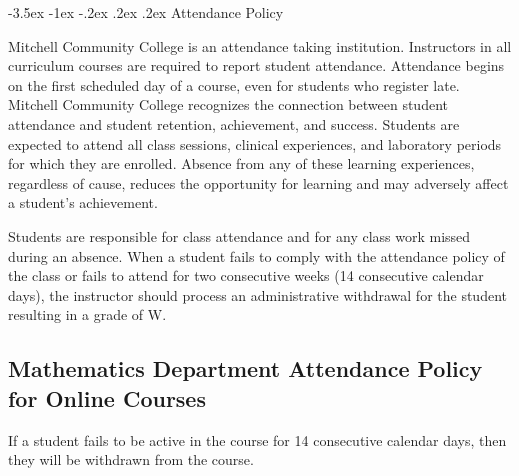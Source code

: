 \documentclass[11pt]{article}
\makeatletter
\renewcommand\section{\@startsection{section}{1}{0pt}%
  {-3.5ex \@plus -1ex \@minus -.2ex}%
  {.2ex \@plus.2ex}%
  {\normalfont\Large\bfseries}} %
\makeatother
\begin{document}
\section{Attendance Policy}

Mitchell Community College is an attendance taking institution. Instructors in all curriculum courses are required to report student attendance. Attendance begins on the first scheduled day of a course, even for students who register late. Mitchell Community College recognizes the connection between student attendance and student retention, achievement, and success. Students are expected to attend all class sessions, clinical experiences, and laboratory periods for which they are enrolled. Absence from any of these learning experiences, regardless of cause, reduces the opportunity for learning and may adversely affect a student's achievement.

Students are responsible for class attendance and for any class work missed during an absence. When a student fails to comply with the attendance policy of the class or fails to attend for two consecutive weeks (14 consecutive calendar days), the instructor should process an administrative withdrawal for the student resulting in a grade of W.

\subsection{Mathematics Department Attendance Policy for Online Courses}

If a student fails to be active in the course for 14 consecutive calendar days, then they will be withdrawn from the course.
\end{document}
